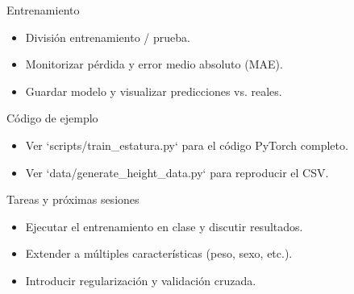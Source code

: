 \documentclass{beamer}
\begin{document}
\begin{frame}{Entrenamiento}
  \begin{itemize}
    \item División entrenamiento / prueba.
    \item Monitorizar pérdida y error medio absoluto (MAE).
    \item Guardar modelo y visualizar predicciones vs. reales.
  \end{itemize}
\end{frame}

\begin{frame}{Código de ejemplo}
  \begin{itemize}
    \item Ver `scripts/train_estatura.py` para el código PyTorch completo.
    \item Ver `data/generate_height_data.py` para reproducir el CSV.
  \end{itemize}
\end{frame}

\begin{frame}{Tareas y próximas sesiones}
  \begin{itemize}
    \item Ejecutar el entrenamiento en clase y discutir resultados.
    \item Extender a múltiples características (peso, sexo, etc.).
    \item Introducir regularización y validación cruzada.
  \end{itemize}
\end{frame}
\end{document}

